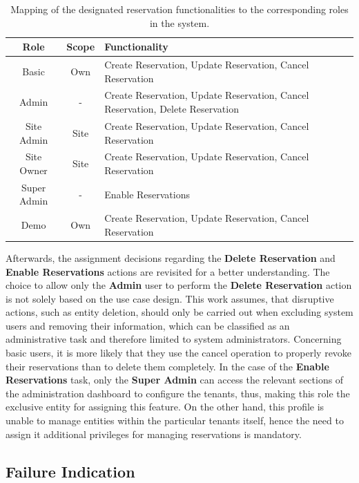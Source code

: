 \begingroup
\setlength{\tabcolsep}{10pt} %
\renewcommand{\arraystretch}{1.5} %
\begin{table}[h]
    \centering
    \caption{Mapping of the designated reservation functionalities to the corresponding roles in the system.}
    \begin{tabular}{c|c|m{9.5cm}}
        Role & Scope & Functionality \\
        \hline
        Basic & Own & Create Reservation, Update Reservation, Cancel Reservation \\
        Admin & - & Create Reservation, Update Reservation, Cancel Reservation, Delete Reservation \\
        Site Admin & Site & Create Reservation, Update Reservation, Cancel Reservation \\
        Site Owner & Site & Create Reservation, Update Reservation, Cancel Reservation \\
        Super Admin & - & Enable Reservations \\
        Demo & Own & Create Reservation, Update Reservation, Cancel Reservation \\
    \end{tabular}
    \label{tab:role-function-mapping}
\end{table}
\endgroup

\noindent Afterwards, the assignment decisions regarding the \textbf{Delete Reservation} and \textbf{Enable Reservations} actions are revisited for a better understanding. The choice to allow only the \textbf{Admin} user to perform the \textbf{Delete Reservation} action is not solely based on the use case design.
This work assumes, that disruptive actions, such as entity deletion, should only be carried out when excluding system users and removing their information, which can be classified as an administrative task and therefore limited to system administrators.
Concerning basic users, it is more likely that they use the cancel operation to properly revoke their reservations than to delete them completely.
In the case of the \textbf{Enable Reservations} task, only the \textbf{Super Admin} can access the relevant sections of the administration dashboard to configure the tenants, thus, making this role the exclusive entity for assigning this feature. 
On the other hand, this profile is unable to manage entities within the particular tenants itself, hence the need to assign it additional privileges for managing reservations is mandatory. 

\subsection{Failure Indication}
\label{ch:Implementation:sec:Reservation System:ssec:Failure Indication}

